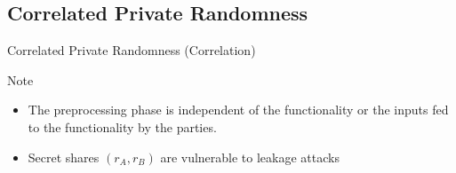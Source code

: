 \subsection{Correlated Private Randomness}
\begin{frame}{Correlated Private Randomness (Correlation)}

	{
	\begin{block}{Note}
	\begin{itemize}
		\item  The preprocessing phase is independent of the functionality or the inputs fed to the functionality by the parties.
		\item Secret shares $(r_A, r_B)  $ are vulnerable to leakage attacks
	\end{itemize}
	\end{block}}

		
\end{frame}

%	
		
